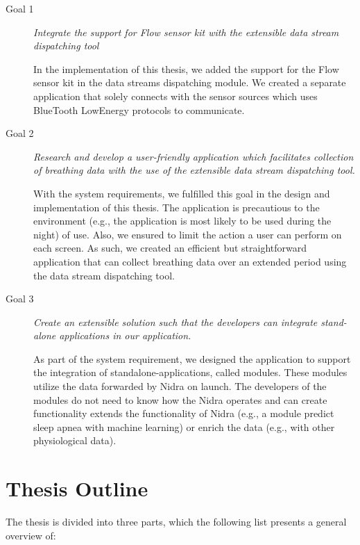 \begin{description}
    \item[Goal 1] \textit{Integrate the support for Flow sensor kit with the extensible data stream dispatching tool}
    
    In the implementation of this thesis, we added the support for the Flow sensor kit in the data streams dispatching module. We created a separate application that solely connects with the sensor sources which uses BlueTooth LowEnergy protocols to communicate.

    \item[Goal 2] \textit{Research and develop a user-friendly application which facilitates collection of breathing data with the use of the extensible data stream dispatching tool.}
    
    With the system requirements, we fulfilled this goal in the design and implementation of this thesis. The application is precautious to the environment (e.g., the application is most likely to be used during the night) of use. Also, we ensured to limit the action a user can perform on each screen. As such, we created an efficient but straightforward application that can collect breathing data over an extended period using the data stream dispatching tool. 
    
    \item[Goal 3] \textit{Create an extensible solution such that the developers can integrate stand-alone applications in our application.}

    As part of the system requirement, we designed the application to support the integration of standalone-applications, called modules. These modules utilize the data forwarded by Nidra on launch. The developers of the modules do not need to know how the Nidra operates and can create functionality extends the functionality of Nidra (e.g., a module predict sleep apnea with machine learning) or enrich the data (e.g., with other physiological data).   
\end{description}



\section{Thesis Outline}
The thesis is divided into three parts, which the following list presents a general overview of:


